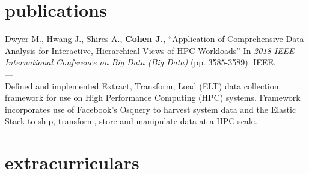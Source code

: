 \documentclass[print]{friggeri-cv} %
\begin{document}







\section{publications}

Dwyer M., Hwang J., Shires A., \textbf{Cohen J.}, “Application of Comprehensive Data Analysis for Interactive, Hierarchical Views of HPC Workloads” In \textit{2018 IEEE International Conference on Big Data (Big Data)} (pp. 3585-3589). IEEE. \\ --- \\
Defined and implemented Extract, Transform, Load (ELT) data collection framework for use on High Performance Computing (HPC) systems. Framework incorporates use of Facebook’s Osquery to harvest system data and the Elastic Stack to ship, transform, store and manipulate data at a HPC scale.

%
%


\section{extracurriculars}
\end{document}
